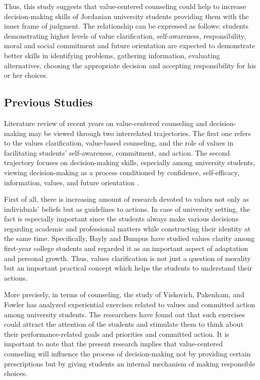 \documentclass[10pt]{NSP1}
\begin{document}
Thus, this study suggests that value-centered counseling could help to increase decision-making skills of Jordanian university students providing them with the inner frame of judgment. The relationship can be expressed as follows: students demonstrating higher levels of value clarification, self-awareness, responsibility, moral and social commitment and future orientation are expected to demonstrate better skills in identifying problems, gathering information, evaluating alternatives, choosing the appropriate decision and accepting responsibility for his or her choices.

\subsection{Previous Studies}

Literature review of recent years on value-centered counseling and decision-making may be viewed through two interrelated trajectories. The first one refers to the values clarification, value-based counseling, and the role of values in facilitating students' self-awareness, commitment, and action. The second trajectory focuses on decision-making skills, especially among university students, viewing decision-making as a process conditioned by confidence, self-efficacy, information, values, and future orientation \cite{ref21}.

First of all, there is increasing amount of research devoted to values not only as individuals' beliefs but as guidelines to actions. In case of university setting, the fact is especially important since the students always make various decisions regarding academic and professional matters while constructing their identity at the same time. Specifically, \cite{ref22} Bayly and Bumpus have studied values clarity among first-year college students and regarded it as an important aspect of adaptation and personal growth. Thus, values clarification is not just a question of morality but an important practical concept which helps the students to understand their actions.

More precisely, in terms of counseling, the study of \cite{ref23} Viskovich, Pakenham, and Fowler has analyzed experiential exercises related to values and committed action among university students. The researchers have found out that such exercises could attract the attention of the students and stimulate them to think about their performance-related goals and priorities and committed action. It is important to note that the present research implies that value-centered counseling will influence the process of decision-making not by providing certain prescriptions but by giving students an internal mechanism of making responsible choices.
\end{document}
